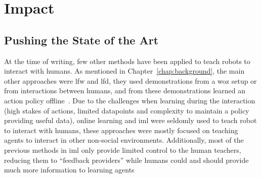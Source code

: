 
\section{Impact} \label{sec:disc_impact}

\subsection{Pushing the State of the Art}

At the time of writing, few other methods have been applied to teach robots to interact with humans. As mentioned in Chapter~\ref{chap:background}, the main other approaches were \gls{lfw} and \gls{lfd}, they used demonstrations from a \gls{woz} setup or from interactions between humans, and from these demonstrations learned an action policy offline~\citep{knox2014learning,liu2014train,sequeira2016discovering}. Due to the challenges when learning during the interaction (high stakes of actions, limited datapoints and complexity to maintain a policy providing useful data), online learning and \gls{iml} were seldomly used to teach robot to interact with humans, these approaches were mostly focused on teaching agents to interact in other non-social environments. Additionally, most of the previous methods in \gls{iml} only provide limited control to the human teachers, reducing them to ``feedback providers'' while humans could and should provide much more information to learning agents~\citep{amershi2014power}
	
